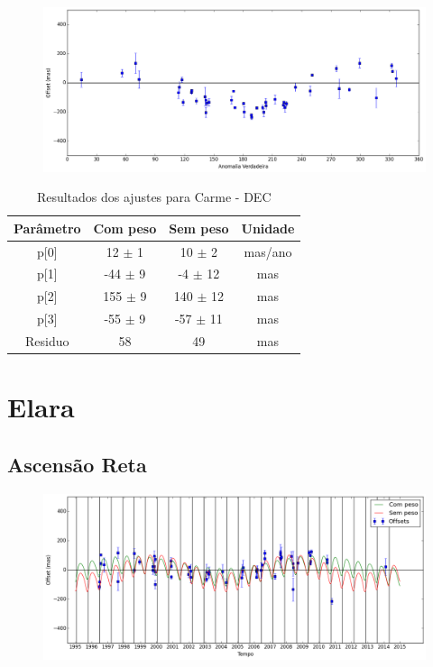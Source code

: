 \documentclass[11pt,a4paper]{report}
\begin{document}
\begin{figure}[h]
\includegraphics[scale=0.45]{Carme/DEC_anom.png}  
\end{figure}

\begin{table}[h!]
\caption{\label{Tab: Carme-DEC} Resultados dos ajustes para Carme - DEC}
\begin{centering}
\begin{tabular}{cccc}
\hline
\hline
Parâmetro & Com peso & Sem peso & Unidade\tabularnewline
\hline
p[0] & 12 $\pm$ 1 & 10 $\pm$ 2 & mas/ano\\
p[1] & -44 $\pm$ 9 & -4 $\pm$ 12 & mas\\
p[2] & 155 $\pm$ 9 & 140 $\pm$ 12 & mas\\
p[3] & -55 $\pm$ 9 & -57 $\pm$ 11 & mas\\
Residuo & 58 & 49 & mas\\
\hline 
\end{tabular} 
\par\end{centering}
\end{table}

\chapter*{Elara}
\section*{Ascensão Reta}

\begin{figure}[h]
\includegraphics[scale=0.45]{Elara/RA.png} 
\end{figure}
\end{document}
